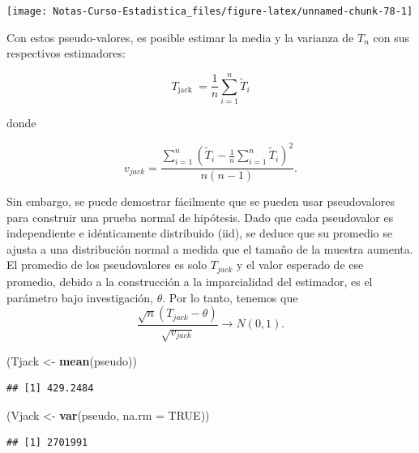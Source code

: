 \documentclass[
  12pt,
]{book}
\newenvironment{Shaded}{\begin{snugshade}}{\end{snugshade}}
\newcommand{\DataTypeTok}[1]{\textcolor[rgb]{0.13,0.29,0.53}{#1}}
\newcommand{\KeywordTok}[1]{\textcolor[rgb]{0.13,0.29,0.53}{\textbf{#1}}}
\newcommand{\NormalTok}[1]{#1}
\newcommand{\OtherTok}[1]{\textcolor[rgb]{0.56,0.35,0.01}{#1}}
\newcommand{\StringTok}[1]{\textcolor[rgb]{0.31,0.60,0.02}{#1}}
\theoremstyle{definition}
\theoremstyle{definition}
\theoremstyle{definition}
\theoremstyle{remark}
\let\BeginKnitrBlock\begin \let\EndKnitrBlock\end
\begin{document}
\begin{center}\texttt{[image: Notas-Curso-Estadistica\_files/figure-latex/unnamed-chunk-78-1]} \end{center}

Con estos pseudo-valores, es posible estimar la media y la varianza de
\(T_{n}\) con sus respectivos estimadores:

\[
T_{\text {jack }}=\frac{1}{n} \sum_{i=1}^{n} \widetilde{T}_{i}
\]

donde

\[
v_{jack}=\frac{\sum_{i=1}^{n}\left(\widetilde{T}_{i}-\frac{1}{n}
\sum_{i=1}^{n} \widetilde{T}_{i}\right)^{2}}{n(n-1)}.
\]

\BeginKnitrBlock{remark}
{}
Sin embargo, se puede demostrar fácilmente que se pueden usar
pseudovalores para construir una prueba normal de hipótesis. Dado que
cada pseudovalor es independiente e idénticamente distribuido (iid),
se deduce que su promedio se ajusta a una distribución normal a medida
que el tamaño de la muestra aumenta. El promedio de los pseudovalores
es solo \(T_ {jack}\) y el valor esperado de ese promedio, debido a la
construcción a la imparcialidad del estimador, es el parámetro bajo
investigación, \(\theta\). Por lo tanto, tenemos que
\[
  \frac{\sqrt{n}\left(T_{jack}-\theta\right)}{\sqrt{v_{jack}}}
  \rightarrow N(0,1).
\]
\EndKnitrBlock{remark}

\BeginKnitrBlock{exercise}
\protect\hypertarget{exr:unnamed-chunk-80}{}{\label{exr:unnamed-chunk-80} }
\EndKnitrBlock{exercise}

\begin{Shaded}
\begin{Highlighting}[]
\NormalTok{(Tjack <-}\StringTok{ }\KeywordTok{mean}\NormalTok{(pseudo))}
\end{Highlighting}
\end{Shaded}

\begin{verbatim}
## [1] 429.2484
\end{verbatim}

\begin{Shaded}
\begin{Highlighting}[]
\NormalTok{(Vjack <-}\StringTok{ }\KeywordTok{var}\NormalTok{(pseudo, }\DataTypeTok{na.rm =} \OtherTok{TRUE}\NormalTok{))}
\end{Highlighting}
\end{Shaded}

\begin{verbatim}
## [1] 2701991
\end{verbatim}
\end{document}
